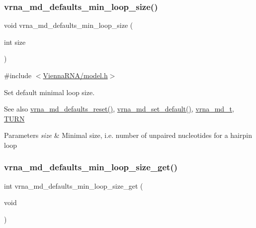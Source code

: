 \subsubsection{\texorpdfstring{vrna\+\_\+md\+\_\+defaults\+\_\+min\+\_\+loop\+\_\+size()}{vrna\_md\_defaults\_min\_loop\_size()}}
{\footnotesize\ttfamily void vrna\+\_\+md\+\_\+defaults\+\_\+min\+\_\+loop\+\_\+size (\begin{DoxyParamCaption}\item[{int}]{size }\end{DoxyParamCaption})}



{\ttfamily \#include $<$\hyperlink{model_8h}{Vienna\+R\+N\+A/model.\+h}$>$}



Set default minimal loop size. 

\begin{DoxySeeAlso}{See also}
\hyperlink{group__model__details_ga70834424cf804d149937de89f80ceb45}{vrna\+\_\+md\+\_\+defaults\+\_\+reset()}, \hyperlink{group__model__details_ga8ac6ff84936282436f822644bf841f66}{vrna\+\_\+md\+\_\+set\+\_\+default()}, \hyperlink{group__model__details_ga1f8a10e12a0a1915f2a4eff0b28ea17c}{vrna\+\_\+md\+\_\+t}, \hyperlink{energy__const_8h_ae646250fd59311356c7e5722a81c3a96}{T\+U\+RN} 
\end{DoxySeeAlso}

\begin{DoxyParams}{Parameters}
{\em size} & Minimal size, i.\+e. number of unpaired nucleotides for a hairpin loop \\
\hline
\end{DoxyParams}
\mbox{\label{group__model__details_ga5cc691174a75c652807dc361b617632a}} 
\subsubsection{\texorpdfstring{vrna\+\_\+md\+\_\+defaults\+\_\+min\+\_\+loop\+\_\+size\+\_\+get()}{vrna\_md\_defaults\_min\_loop\_size\_get()}}
{\footnotesize\ttfamily int vrna\+\_\+md\+\_\+defaults\+\_\+min\+\_\+loop\+\_\+size\+\_\+get (\begin{DoxyParamCaption}\item[{void}]{ }\end{DoxyParamCaption})}



